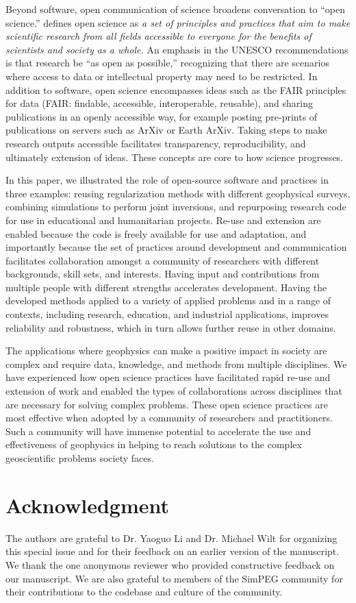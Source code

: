 Beyond software, open communication of science broadens conversation to ``open science.'' \cite{unesco_introduction_2023} defines open science as \emph{a set of principles and practices that aim to make scientific research from all fields accessible to everyone for the benefits of scientists and society as a whole.} An emphasis in the UNESCO recommendations is that research be ``as open as possible,'' recognizing that there are scenarios where access to data or intellectual property may need to be restricted. In addition to software, open science encompasses ideas such as the FAIR principles for data (FAIR: findable, accessible, interoperable, reusable), and sharing publications in an openly accessible way, for example posting pre-prints of publications on servers such as ArXiv or Earth ArXiv. Taking steps to make research outputs accessible facilitates transparency, reproducibility, and ultimately extension of ideas. These concepts are core to how science progresses.

In this paper, we illustrated the role of open-source software and practices in three examples: reusing regularization methods with different geophysical surveys, combining simulations to perform joint inversions, and repurposing research code for use in educational and humanitarian projects. Re-use and extension are enabled because the code is freely available for use and adaptation, and importantly because the set of practices around development and communication facilitates collaboration amongst a community of researchers with different backgrounds, skill sets, and interests. Having input and contributions from multiple people with different strengths accelerates development. Having the developed methods applied to a variety of applied problems and in a range of contexts, including research, education, and industrial applications, improves reliability and robustness, which in turn allows further reuse in other domains.

The applications where geophysics can make a positive impact in society are complex and require data, knowledge, and methods from multiple disciplines. We have experienced how open science practices have facilitated rapid re-use and extension of work and enabled the types of collaborations across disciplines that are necessary for solving complex problems. These open science practices are most effective when adopted by a community of researchers and practitioners. Such a community will have immense potential to accelerate the use and effectiveness of geophysics in helping to reach solutions to the complex geoscientific problems society faces.

\section{Acknowledgment}

The authors are grateful to Dr. Yaoguo Li and Dr. Michael Wilt for organizing this special issue and for their feedback on an earlier version of the manuscript. We thank the one anonymous reviewer who provided constructive feedback on our manuscript. We are also grateful to members of the SimPEG community for their contributions to the codebase and culture of the community.
